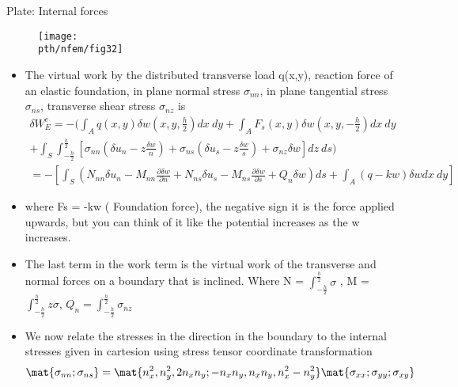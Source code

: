 	\begin{frame}{Plate: Internal forces}
		\begin{figure}
			\centering
			\texttt{[image: \\pth/nfem/fig32]} 		
		\end{figure}
	\end{frame}


	\begin{frame}
		\begin{itemize}
			\item The virtual work by the distributed transverse load q(x,y), reaction force of an elastic foundation, in plane normal stress $\sigma_{nn}$, in plane tangential stress $\sigma_{ns}$, transverse shear stress $\sigma_{nz}$ is 
			\begin{equation}
			\begin{aligned}
				\delta W_E^e = - (\int_A q(x,y) \delta w(x,y,\frac{h}{2}) dx~dy + 
				\int_A F_s(x,y) \delta w(x,y,-\frac{h}{2}) dx~dy
				\\	+ \int_S \int_{-\frac{h}{2}}^{\frac{h}{2}} \left[ \sigma_{nn} \left(\delta u_n - z \frac{\delta w}{n} \right) + \sigma_{ns} \left(\delta u_s - z \frac{\delta w}{s}\right) 
				+ \sigma_{nz}\delta w\right] dz~ds ) \\ 
				= - \left[ \int_S \left(N_{nn}\delta u_n - M_{nn}\frac{\partial \delta w}{\partial n}
							+ N_{ns}\delta u_s 
				            - M_{ns}\frac{\partial \delta w}{\partial s} + Q_n \delta w \right)ds
				            + \int_A (q-kw)\delta w dx~dy
				 \right] 
			\end{aligned}
			\end{equation}
			\item where Fs = -kw ( Foundation force), the negative sign it is the force applied upwards, but you can think of it like the potential increases as the w increases.
			\item The last term in the work term is the virtual work of the transverse and normal forces on a boundary that is inclined. Where N = $\int_{-\frac{h}{2}}^{\frac{h}{2}}\sigma$ ,  M = $\int_{-\frac{h}{2}}^{\frac{h}{2}}z\sigma$, $Q_n = \int_{-\frac{h}{2}}^{\frac{h}{2}}\sigma_{nz}$ 
		\end{itemize}
	\end{frame}


	\begin{frame}
	\begin{itemize}
		\item We now relate the stresses in the direction in the boundary to the internal stresses given in cartesion using stress tensor coordinate transformation
			\begin{equation}
			   \mat{\sigma_{nn}; \sigma_{ns}} = \mat{n_x^2,n_y^2,2n_xn_y ; -n_xn_y,n_xn_y,n_x^2 - n_y^2} \mat{\sigma_{xx};\sigma_{yy};\sigma_{xy}}
			\end{equation}
	\end{itemize}
	\end{frame}


